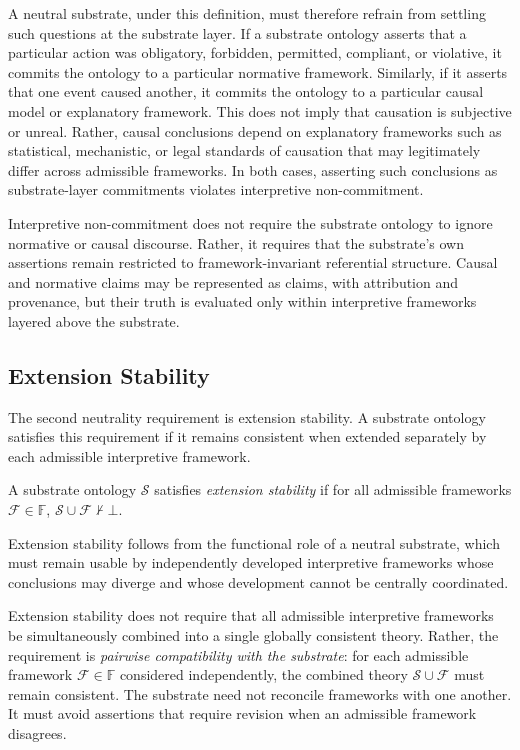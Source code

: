 A neutral substrate,
under this definition,
must therefore refrain from
settling such questions at the substrate layer.
If a substrate ontology asserts that a particular action was
obligatory, forbidden, permitted, compliant, or violative,
it commits the ontology to a particular normative framework.
Similarly, if it asserts that one event caused another,
it commits the ontology to a particular causal model or explanatory framework.
This does not imply that causation is subjective or unreal.
Rather, causal conclusions depend on explanatory frameworks
such as statistical, mechanistic, or legal standards of causation
that may legitimately differ across admissible frameworks.
In both cases, asserting such conclusions as substrate-layer commitments
violates interpretive non-commitment.

Interpretive non-commitment does not require the substrate ontology
to ignore normative or causal discourse.
Rather, it requires that the substrate's own assertions
remain restricted to framework-invariant referential structure.
Causal and normative claims may be represented as claims,
with attribution and provenance,
but their truth is evaluated only within interpretive frameworks
layered above the substrate.

\subsection{Extension Stability}
\label{subsec:extension-stability}

The second neutrality requirement is extension stability.
A substrate ontology satisfies this requirement if it remains consistent
when extended separately by each admissible interpretive framework.

\begin{definition}
  \label{def:extension-stability}
  A substrate ontology $\mathcal{S}$ satisfies \emph{extension stability}
  if for all admissible frameworks $\mathcal{F} \in \mathbb{F}$,
  $\mathcal{S} \cup \mathcal{F} \not\vdash \bot$.
\end{definition}

Extension stability follows from the functional role of a neutral substrate,
which must remain usable by independently developed
interpretive frameworks whose conclusions may diverge
and whose development cannot be centrally coordinated.

Extension stability does not require that all admissible interpretive frameworks
be simultaneously combined into a single globally consistent theory.
Rather, the requirement is \emph{pairwise compatibility with the substrate}:
for each admissible framework $\mathcal{F} \in \mathbb{F}$ considered independently,
the combined theory $\mathcal{S} \cup \mathcal{F}$ must remain consistent.
The substrate need not reconcile frameworks with one another.
It must avoid assertions that require revision when
an admissible framework disagrees.

